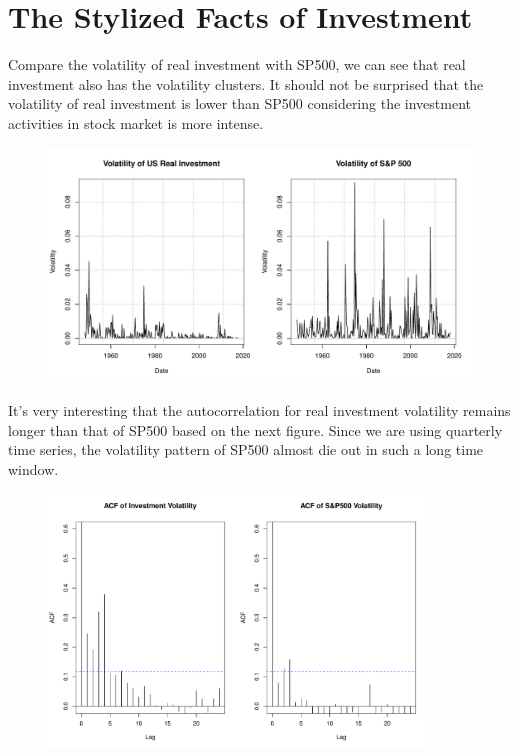 \documentclass[12pt]{article}
\theoremstyle{definition}
\numberwithin{equation}{section}
\numberwithin{figure}{section}
\numberwithin{table}{section}
\begin{document}
\section{The Stylized Facts of Investment}

Compare the volatility of real investment with SP500, we can see that real investment also has the volatility clusters. It should not be surprised that the volatility of real investment is lower than SP500 considering the investment activities in stock market is more intense.
\begin{figure}[H]
  \centering
  \includegraphics[width=\textwidth]{../Figures/VolatInvSP500}
\end{figure}
It's very interesting that the autocorrelation for real investment volatility remains longer than that of SP500 based on the next figure. Since we are using quarterly time series, the volatility pattern of SP500 almost die out in such a long time window.
\begin{figure}[H]
  \centering
  \includegraphics[width=0.9\textwidth]{../Figures/AcfInvSP500}
\end{figure}
\end{document}
